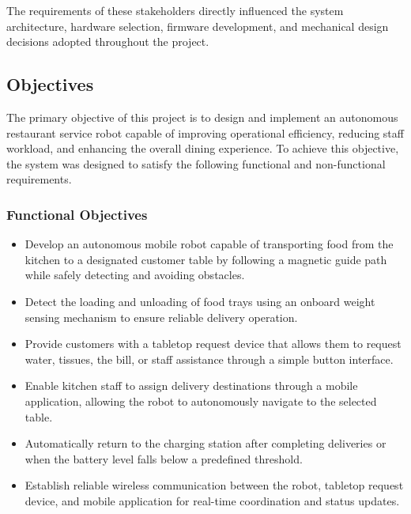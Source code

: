 \documentclass[12pt,a4paper]{article}
\begin{document}
The requirements of these stakeholders directly influenced the system
architecture, hardware selection, firmware development, and mechanical
design decisions adopted throughout the project.

\subsection{Objectives}

The primary objective of this project is to design and implement an
autonomous restaurant service robot capable of improving operational
efficiency, reducing staff workload, and enhancing the overall dining
experience. To achieve this objective, the system was designed to
satisfy the following functional and non-functional requirements.

\subsubsection*{Functional Objectives}

\begin{itemize}[nosep]
    \item Develop an autonomous mobile robot capable of transporting
    food from the kitchen to a designated customer table by following
    a magnetic guide path while safely detecting and avoiding
    obstacles.

    \item Detect the loading and unloading of food trays using an
    onboard weight sensing mechanism to ensure reliable delivery
    operation.

    \item Provide customers with a tabletop request device that allows
    them to request water, tissues, the bill, or staff assistance
    through a simple button interface.

    \item Enable kitchen staff to assign delivery destinations through
    a mobile application, allowing the robot to autonomously navigate
    to the selected table.

    \item Automatically return to the charging station after completing
    deliveries or when the battery level falls below a predefined
    threshold.

    \item Establish reliable wireless communication between the robot,
    tabletop request device, and mobile application for real-time
    coordination and status updates.
\end{itemize}
\end{document}

